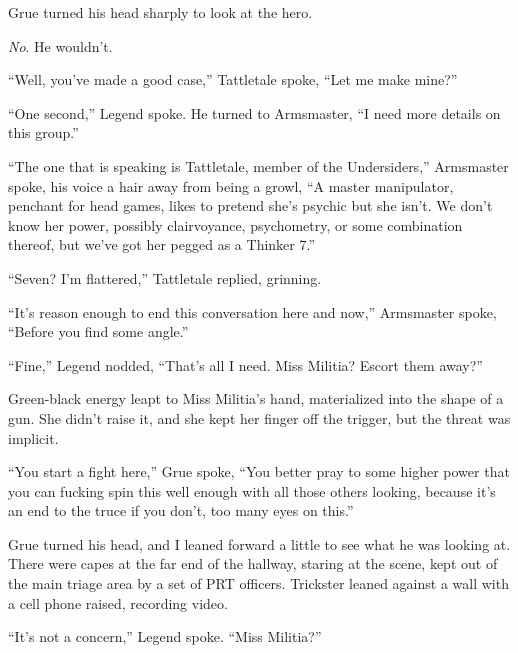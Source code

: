 Grue turned his head sharply to look at the hero.



\emph{No}.  He wouldn't.



``Well, you've made a good case,'' Tattletale spoke, ``Let me make mine?''



``One second,'' Legend spoke.  He turned to Armsmaster, ``I need more details on this group.''



``The one that is speaking is Tattletale, member of the Undersiders,'' Armsmaster spoke, his voice a hair away from being a growl, ``A master manipulator, penchant for head games, likes to pretend she's psychic but she isn't.  We don't know her power, possibly clairvoyance, psychometry, or some combination thereof, but we've got her pegged as a Thinker 7.''



``Seven?  I'm flattered,'' Tattletale replied, grinning.



``It's reason enough to end this conversation here and now,'' Armsmaster spoke, ``Before you find some angle.''



``Fine,'' Legend nodded, ``That's all I need.  Miss Militia?  Escort them away?''



Green-black energy leapt to Miss Militia's hand, materialized into the shape of a gun.  She didn't raise it, and she kept her finger off the trigger, but the threat was implicit.



``You start a fight here,'' Grue spoke, ``You better pray to some higher power that you can fucking spin this well enough with all those others looking, because it's an end to the truce if you don't, too many eyes on this.''



Grue turned his head, and I leaned forward a little to see what he was looking at.  There were capes at the far end of the hallway, staring at the scene, kept out of the main triage area by a set of PRT officers.  Trickster leaned against a wall with a cell phone raised, recording video.



``It's not a concern,'' Legend spoke.  ``Miss Militia?''



